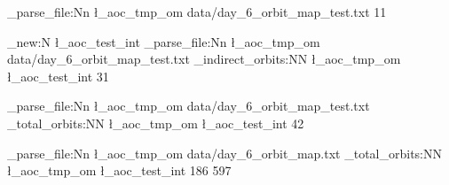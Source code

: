   {
    \om_parse_file:Nn \l_aoc_tmp_om { data/day_6_orbit_map_test.txt }
     { 11 }
  }

\int_new:N \l_aoc_test_int
  {
    \om_parse_file:Nn \l_aoc_tmp_om { data/day_6_orbit_map_test.txt }
    \om_indirect_orbits:NN \l_aoc_tmp_om \l_aoc_test_int
     { 31 }
  }

  {
    \om_parse_file:Nn \l_aoc_tmp_om { data/day_6_orbit_map_test.txt }
    \om_total_orbits:NN \l_aoc_tmp_om \l_aoc_test_int
     { 42 }
  }

  {
    \om_parse_file:Nn \l_aoc_tmp_om { data/day_6_orbit_map.txt }
    \om_total_orbits:NN \l_aoc_tmp_om \l_aoc_test_int
     { 186 597 }
  }

\END
\batchmode
